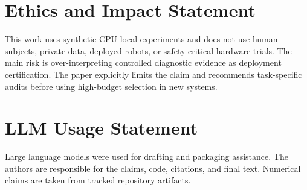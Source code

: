 \documentclass{article}
\begin{document}
\section*{Ethics and Impact Statement}
This work uses synthetic CPU-local experiments and does not use human subjects, private data, deployed robots, or safety-critical hardware trials. The main risk is over-interpreting controlled diagnostic evidence as deployment certification. The paper explicitly limits the claim and recommends task-specific audits before using high-budget selection in new systems.

\section*{LLM Usage Statement}
Large language models were used for drafting and packaging assistance. The authors are responsible for the claims, code, citations, and final text. Numerical claims are taken from tracked repository artifacts.

\label{maintextend}



\appendix

\end{document}
